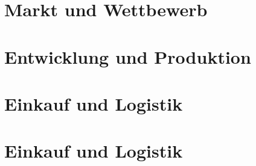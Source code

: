 \documentclass[12pt,a4paper]{scrartcl}
\begin{document}
\section{Markt und Wettbewerb}

\section{Entwicklung und Produktion}

\section{Einkauf und Logistik}

\section{Einkauf und Logistik}

%
\end{document}
